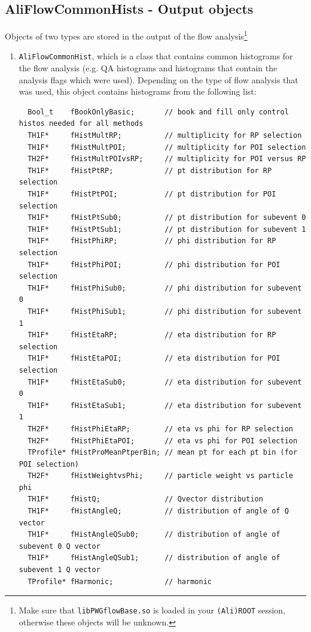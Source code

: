 \documentclass[a5paper]{book}
\numberwithin{equation}{subsection}
\begin{document}
\subsection{AliFlowCommonHists - Output objects}
Objects of two types are stored in the output of the flow analysis\footnote{Make sure that \texttt{libPWGflowBase.so} is loaded in your \texttt{(Ali)ROOT} session, otherwise these objects will be unknown.}
\begin{enumerate}
\item \texttt{AliFlowCommonHist}, which is a class that contains common histograms for the flow analysis (e.g. QA histograms and histograms that contain the analysis flags which were used). Depending on the type of flow analysis that was used, this object contains histograms from the following list:
\begin{lstlisting}
  Bool_t    fBookOnlyBasic;       // book and fill only control histos needed for all methods
  TH1F*     fHistMultRP;          // multiplicity for RP selection
  TH1F*     fHistMultPOI;         // multiplicity for POI selection
  TH2F*     fHistMultPOIvsRP;     // multiplicity for POI versus RP
  TH1F*     fHistPtRP;            // pt distribution for RP selection
  TH1F*     fHistPtPOI;           // pt distribution for POI selection
  TH1F*     fHistPtSub0;          // pt distribution for subevent 0
  TH1F*     fHistPtSub1;          // pt distribution for subevent 1
  TH1F*     fHistPhiRP;           // phi distribution for RP selection
  TH1F*     fHistPhiPOI;          // phi distribution for POI selection
  TH1F*     fHistPhiSub0;         // phi distribution for subevent 0
  TH1F*     fHistPhiSub1;         // phi distribution for subevent 1
  TH1F*     fHistEtaRP;           // eta distribution for RP selection
  TH1F*     fHistEtaPOI;          // eta distribution for POI selection
  TH1F*     fHistEtaSub0;         // eta distribution for subevent 0
  TH1F*     fHistEtaSub1;         // eta distribution for subevent 1
  TH2F*     fHistPhiEtaRP;        // eta vs phi for RP selection
  TH2F*     fHistPhiEtaPOI;       // eta vs phi for POI selection
  TProfile* fHistProMeanPtperBin; // mean pt for each pt bin (for POI selection)
  TH2F*     fHistWeightvsPhi;     // particle weight vs particle phi
  TH1F*     fHistQ;               // Qvector distribution
  TH1F*     fHistAngleQ;          // distribution of angle of Q vector
  TH1F*     fHistAngleQSub0;      // distribution of angle of subevent 0 Q vector
  TH1F*     fHistAngleQSub1;      // distribution of angle of subevent 1 Q vector
  TProfile* fHarmonic;            // harmonic 

\end{lstlisting}
\end{enumerate}
\end{document}
